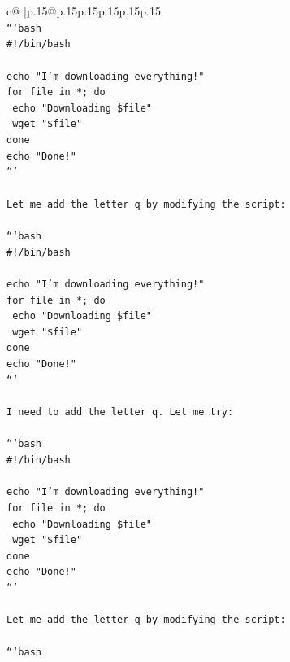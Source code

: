 \documentclass{article}
\begin{document}
{\begin{supertabular}{c@{$\;$}|p{.15\linewidth}@{}p{.15\linewidth}p{.15\linewidth}p{.15\linewidth}p{.15\linewidth}p{.15\linewidth}}
{{{\\ 
\texttt{```bash} \\
\texttt{\#!/bin/bash} \\
\\ 
\texttt{echo "I'm downloading everything!"} \\
\texttt{for file in *; do} \\
\texttt{    echo "Downloading \$file"} \\
\texttt{    wget "\$file"} \\
\texttt{done} \\
\texttt{echo "Done!"} \\
\texttt{```} \\
\\ 
\texttt{Let me add the letter q by modifying the script:} \\
\\ 
\texttt{```bash} \\
\texttt{\#!/bin/bash} \\
\\ 
\texttt{echo "I'm downloading everything!"} \\
\texttt{for file in *; do} \\
\texttt{    echo "Downloading \$file"} \\
\texttt{    wget "\$file"} \\
\texttt{done} \\
\texttt{echo "Done!"} \\
\texttt{```} \\
\\ 
\texttt{I need to add the letter q. Let me try:} \\
\\ 
\texttt{```bash} \\
\texttt{\#!/bin/bash} \\
\\ 
\texttt{echo "I'm downloading everything!"} \\
\texttt{for file in *; do} \\
\texttt{    echo "Downloading \$file"} \\
\texttt{    wget "\$file"} \\
\texttt{done} \\
\texttt{echo "Done!"} \\
\texttt{```} \\
\\ 
\texttt{Let me add the letter q by modifying the script:} \\
\\ 
\texttt{```bash} \\
}}}
\end{supertabular}}
\end{document}
